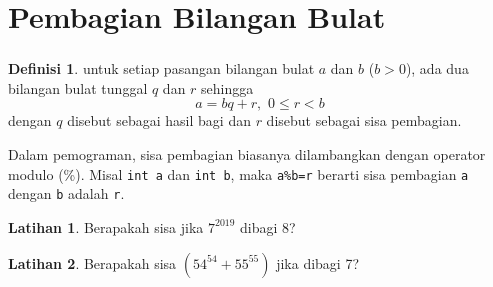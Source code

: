 \documentclass[aspectratio=169]{beamer}
\theoremstyle{definition}
\newtheorem{definisi}{Definisi}
\newtheorem{latihan}{Latihan}
\begin{document}
\section{Pembagian Bilangan Bulat}
\begin{frame}
    \frametitle{\insertsection}
    \begin{definisi}
        untuk setiap pasangan bilangan bulat $a$ dan $b$ ($b>0$), ada dua bilangan bulat tunggal $q$ dan $r$ sehingga
        \[a = bq + r,\,\, 0 \leq r < b\]
        dengan $q$ disebut sebagai hasil bagi dan $r$ disebut sebagai sisa pembagian.
    \end{definisi}
    Dalam pemograman, sisa pembagian biasanya dilambangkan dengan operator modulo (\%). Misal \texttt{int a} dan \texttt{int b}, maka \texttt{a\%b=r} berarti sisa pembagian \texttt{a} dengan \texttt{b} adalah \texttt{r}.
\end{frame}

\begin{frame}
    \begin{latihan}
        Berapakah sisa jika \( 7^{2019} \) dibagi 8?
    \end{latihan}
\end{frame}

\begin{frame}
    \begin{latihan}
        Berapakah sisa \( (54^{54}+55^{55}) \) jika dibagi 7?
    \end{latihan}
\end{frame}
\end{document}
